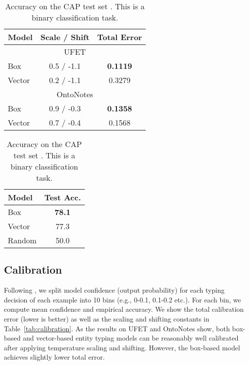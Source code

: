\documentclass[11pt,a4paper]{article}
\begin{document}
\renewcommand{\arraystretch}{1}
\begin{table}[t]
	\small
	\setlength{\tabcolsep}{4pt}
	\begin{minipage}{.6\columnwidth}
	 \centering
	\begin{tabular}{l  c  c}
		\toprule
		\multicolumn{1}{l}{Model} & \multicolumn{1}{l}{Scale / Shift} & \multicolumn{1}{l}{Total Error} \\
		 \midrule
 		 \multicolumn{3}{c}{UFET} \\
		 \midrule
		 Box & 0.5 / -1.1 & \textbf{0.1119}\\
         Vector & 0.2 / -1.1 &  0.3279 \\
		 \midrule
 		 \multicolumn{3}{c}{OntoNotes}\\
		 \midrule
		 Box & 0.9 / -0.3 & \textbf{0.1358}\\
         Vector & 0.7 / -0.4 & 0.1568\\
		\bottomrule 
	\end{tabular}
	\caption{Total calibration error on UFET and OntroNotes. We scale and shift logits post-hoc.}
	\label{tab:calibration}
	\end{minipage}
	\hspace{3pt}
	\begin{minipage}{.34\columnwidth}
	\vspace{-23pt}
	 \centering
		\begin{tabular}{l c}
		\toprule
		\multicolumn{1}{l}{Model} & {Test Acc.}\\
		\midrule
        Box & \textbf{78.1} \\
        Vector &  77.3 \\
        Random & 50.0 \\
		\bottomrule
	\end{tabular}
	\caption{Accuracy on the CAP test set \cite{Mingda_Chen_19}. This is a binary classification task.}
	\label{tab:cap}
	\end{minipage}
	\vspace{-6pt}
\end{table}


\subsection{Calibration}

Following \citet{Khanh_Nguyen_15}, we split model confidence (output probability) for each typing decision of each example into 10 bins (e.g., 0-0.1, 0.1-0.2 etc.). For each bin, we compute mean confidence and empirical accuracy. We show the total calibration error (lower is better) as well as the scaling and shifting constants in Table~\ref{tab:calibration}. As the results on UFET and OntoNotes show, both box-based and vector-based entity typing models can be reasonably well calibrated after applying temperature scaling and shifting. However, the box-based model achieves slightly lower total error. %
\end{document}
